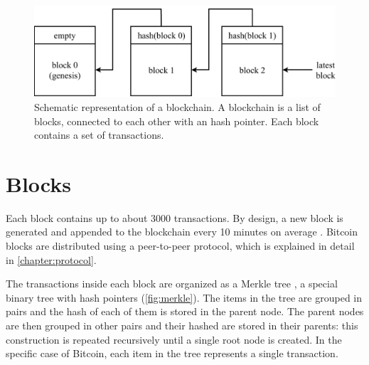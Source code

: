 \begin{figure}[h]
	\centering
	\vspace*{0.25cm}
	\includegraphics[scale=0.7]{figures/blockchain}
	\vspace*{0.25cm}
	\caption{
		Schematic representation of a blockchain.
		A blockchain is a list of blocks, connected to each other with an hash pointer.
		Each block contains a set of transactions.
	}
	\label{fig:blockchain}
\end{figure}

\section{Blocks}
Each block contains up to about \num{3000} transactions.
By design, a new block is generated and appended to the blockchain every \num{10} minutes on average \cite{bitcoin_2008}.
Bitcoin blocks are distributed using a peer-to-peer protocol, which is explained in detail in \cref{chapter:protocol}.

The transactions inside each block are organized as a Merkle tree \cite{merkle_tree_1980}, a special binary tree with hash pointers (\cref{fig:merkle}).
The items in the tree are grouped in pairs and the hash of each of them is stored in the parent node.
The parent nodes are then grouped in other pairs and their hashed are stored in their parents:
this construction is repeated recursively until a single root node is created.
In the specific case of Bitcoin, each item in the tree represents a single transaction.

